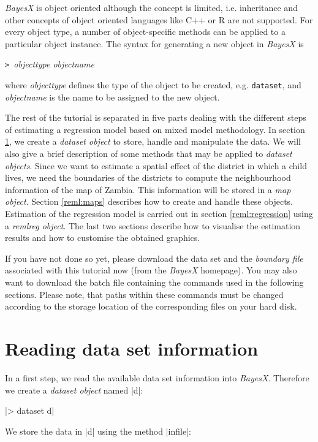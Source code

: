 {\it BayesX} is object oriented although the concept is limited, i.e. inheritance and other concepts of object oriented
languages like C++ or R are not supported. For every object type, a number of object-specific methods can be applied to a
particular object instance. The syntax for generating a new object in {\it BayesX} is

{\tt> }{\it objecttype objectname}

where {\it objecttype} defines the type of the object to be created, e.g. {\tt dataset}, and {\it objectname} is the name to be
assigned to the new object.

The rest of the tutorial is separated in five parts dealing with the different steps of estimating a regression model based on
mixed model methodology. In section \ref{reml:datasets}, we create a {\it dataset object} to store, handle and manipulate the
data. We will also give a brief description of some methods that may be applied to {\it dataset objects}. Since we want to
estimate a spatial effect of the district in which a child lives, we need the boundaries of the districts to compute the
neighbourhood information of the map of Zambia. This information will be stored in a {\it map object}. Section \ref{reml:maps}
describes how to create and handle these objects. Estimation of the regression model is carried out in section
\ref{reml:regression} using a {\it remlreg object}. The last two sections describe how to visualise the estimation results and
how to customise the obtained graphics.

If you have not done so yet, please download the data set and the {\it boundary file} associated with this tutorial now (from
the {\it BayesX} homepage). You may also want to download the batch file containing the commands used in the following
sections. Please note, that paths within these commands must be changed according to the storage location of the corresponding
files on your hard disk.

\section{Reading data set information}\label{reml:datasets}

In a first step, we read the available data set information into {\it BayesX}. Therefore we create a {\it dataset object} named
|d|:

|> dataset d|

We store the data in |d| using the method |infile|:

